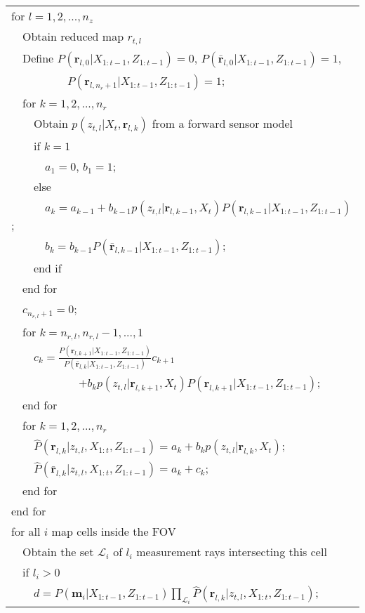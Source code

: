 \begin{table}
\begin{tabular}{ l }
  for $l = 1,2,...,n_z$\\
   \ \ Obtain reduced map $r_{t,l}$\\
   \ \ Define $P(\mathbf{r}_{l,0}|X_{1:t-1},Z_{1:t-1})=0$, $P(\bar{\mathbf{r}}_{l,0}|X_{1:t-1},Z_{1:t-1})=1$, \\  \ \ \ \ \ \ \ \ \ \   $P(\mathbf{r}_{l,n_r+1}|X_{1:t-1},Z_{1:t-1})=1$;\\
   \ \ for $k = 1,2,...,n_r$\\
   \ \ \ \ Obtain $p(z_{t,l}|X_t,\mathbf{r}_{l,k})$ from a forward sensor model\\
   \ \ \ \ if $k=1$\\
   \ \ \ \ \ \ $a_1=0$, $b_1=1$;\\
   \ \ \ \ else\\
   \ \ \ \ \ \ $a_k=a_{k-1}+b_{k-1}p(z_{t,l}|\mathbf{r}_{l,k-1},X_t)P(\mathbf{r}_{l,k-1}|X_{1:t-1},Z_{1:t-1})$;\\
   \ \ \ \ \ \ $b_k=b_{k-1}P(\bar{\mathbf{r}}_{l,k-1}|X_{1:t-1},Z_{1:t-1})$;\\
   \ \ \ \ end if\\
   \ \ end for\\
   \ \ $c_{n_{r,l}+1}=0$;\\
   \ \ for $k = n_{r,l},n_{r,l}-1,...,1$\\
   \ \ \ \ $c_k=\frac{P(\mathbf{r}_{l,k+1}|X_{1:t-1},Z_{1:t-1})}{P(\bar{\mathbf{r}}_{l,k}|X_{1:t-1},Z_{1:t-1})}c_{k+1}$\\
   \ \ \ \ \ \ \ \ \ \ \ \ $+b_{k}p(z_{t,l}|\mathbf{r}_{l,k+1},X_t)P(\mathbf{r}_{l,k+1}|X_{1:t-1},Z_{1:t-1})$;\\
   \ \ end for\\
   \ \ for $k = 1,2,...,n_r$\\
   \ \ \ \ $\hat P(\mathbf{r}_{l,k}|z_{t,l},X_{1:t},Z_{1:t-1})=a_k+b_kp(z_{t,l}|\mathbf{r}_{l,k},X_t)$;\\
   \ \ \ \ $\hat P(\bar{\mathbf{r}}_{l,k}|z_{t,l},X_{1:t},Z_{1:t-1})=a_k+c_k$;\\
   \ \ end for\\
   end for\\
   for all $i$ map cells inside the FOV\\
   \ \ Obtain the set $\mathcal L_i$ of $l_i$ measurement rays intersecting this cell\\
   \ \ if $l_i>0$\\
   \ \ \ \ $d=P(\mathbf{m}_i|X_{1:t-1},Z_{1:t-1})\prod_{\mathcal L_i}\hat P(\mathbf{r}_{l,k}|z_{t,l},X_{1:t},Z_{1:t-1})$;\\

\end{tabular}
\end{table}
